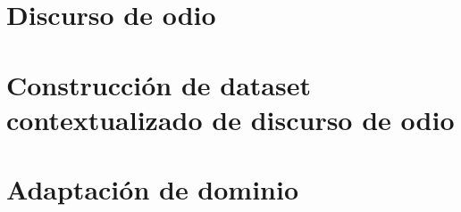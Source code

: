 
\chapter{Discurso de odio}
\label{app:04}


\chapter{Construcción de dataset contextualizado de discurso de odio}
\label{app:05}



\chapter{Adaptación de dominio}
\label{app:07}

